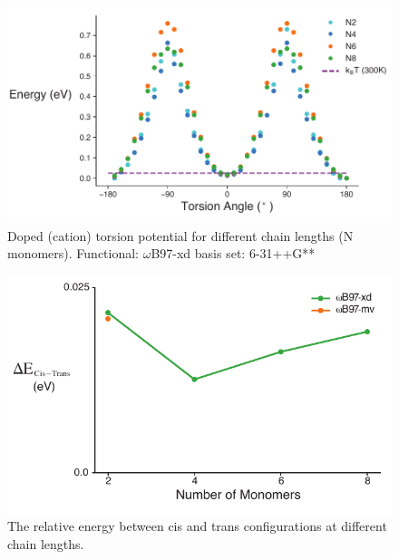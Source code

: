 \begin{figure}[hbt!]
    \centering
    \includegraphics{figures/append_tor_model/SI_cat_diff_lens.pdf}
    \caption[Doped PT Torsion Potential for Different Chain Lengths]{Doped (cation) torsion potential for different chain lengths (N monomers). Functional: $\omega$B97-xd basis set: 6-31++G** }
    \label{fig:cat_dl}
\end{figure}

\begin{figure}[hbt!]
    \centering
    \includegraphics{figures/append_tor_model/delta_e_plot.pdf}
    \caption[Relative Energy Between PT Cis and Trans Configurations at Different Chain Lengths]{The relative energy between cis and trans configurations at different chain lengths.}
    \label{fig:delta_e}
\end{figure}

